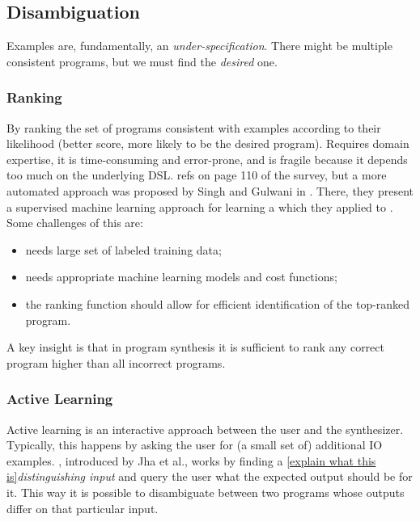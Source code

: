 \subsection{Disambiguation}
\label{sec:resolving-ambiguity}

Examples are, fundamentally, an \textit{under-specification}. There might be
multiple consistent programs, but we must find the \textit{desired} one.

\subsubsection{Ranking}

 By ranking the set of programs
consistent with examples according to their likelihood (better score, more
likely to be the desired program). Requires domain expertise, it is
time-consuming and error-prone, and is fragile because it depends too much on
the underlying \ac{DSL}.  {refs on page 110 of the survey},
but a more automated approach was proposed by Singh and Gulwani in
\cite{Singh:ranking:2015}. There, they present a supervised machine learning
approach for learning a  which
they applied to . Some challenges of this are:
\begin{itemize}
\item needs large set of labeled training data;
\item needs appropriate machine learning models and cost functions;
\item the ranking function should allow for efficient identification of the
  top-ranked program.
\end{itemize}

 A key insight is that in program synthesis it
is sufficient to rank any correct program higher than all incorrect programs.

\subsubsection{Active Learning}

Active learning is an interactive approach between the user and the synthesizer.
Typically, this happens by asking the user for (a small set of) additional
\ac{IO} examples. ,
introduced by Jha et al.\cite{Jha:oracle:2010}, works by finding a \ref{explain
what this is}\textit{distinguishing input} and query the user what the expected
output should be for it. This way it is possible to disambiguate between two
programs whose outputs differ on that particular input.

